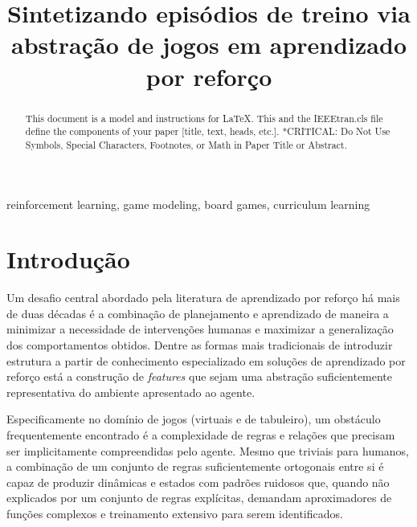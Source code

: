 \documentclass[conference]{IEEEtran}
\begin{document}
\title{Sintetizando episódios de treino via abstração de jogos em aprendizado por reforço}

\author{
}

\maketitle

\begin{abstract}
This document is a model and instructions for \LaTeX.
This and the IEEEtran.cls file define the components of your paper [title, text, heads, etc.]. *CRITICAL: Do Not Use Symbols, Special Characters, Footnotes, 
or Math in Paper Title or Abstract.
\end{abstract}

\begin{IEEEkeywords}
    reinforcement learning, game modeling, board games, curriculum learning
\end{IEEEkeywords}

\section{Introdução}
\label{intro}
Um desafio central abordado pela literatura de aprendizado por reforço há mais de duas décadas é a combinação de planejamento e aprendizado de maneira a minimizar a necessidade de intervenções humanas e maximizar a generalização dos comportamentos obtidos. Dentre as formas mais tradicionais de introduzir estrutura a partir de conhecimento especializado em soluções de aprendizado por reforço está a construção de \textit{features} que sejam uma abstração suficientemente representativa do ambiente apresentado ao agente. 

Especificamente no domínio de jogos (virtuais e de tabuleiro), um obstáculo frequentemente encontrado é a complexidade de regras e relações que precisam ser implicitamente compreendidas pelo agente. Mesmo que triviais para humanos, a combinação de um conjunto de regras suficientemente ortogonais entre si é capaz de produzir dinâmicas e estados com padrões ruidosos que, quando não explicados por um conjunto de regras explícitas, demandam aproximadores de funções complexos e treinamento extensivo para serem identificados.
\end{document}
